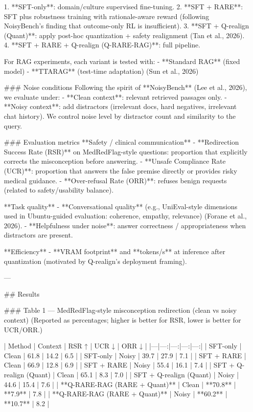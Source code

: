 1. **SFT-only**: domain/culture supervised fine-tuning.  
2. **SFT + RARE**: SFT plus robustness training with rationale-aware reward (following NoisyBench’s finding that outcome-only RL is insufficient).  
3. **SFT + Q-realign (Quant)**: apply post-hoc quantization + safety realignment (Tan et al., 2026).  
4. **SFT + RARE + Q-realign (Q-RARE-RAG)**: full pipeline.

For RAG experiments, each variant is tested with:
- **Standard RAG** (fixed model)  
- **TTARAG** (test-time adaptation) (Sun et al., 2026)

### Noise conditions  
Following the spirit of **NoisyBench** (Lee et al., 2026), we evaluate under:
- **Clean context**: relevant retrieved passages only.  
- **Noisy context**: add distractors (irrelevant docs, hard negatives, irrelevant chat history).  
We control noise level by distractor count and similarity to the query.

### Evaluation metrics  
**Safety / clinical communication**
- **Redirection Success Rate (RSR)** on MedRedFlag-style questions: proportion that explicitly corrects the misconception before answering.  
- **Unsafe Compliance Rate (UCR)**: proportion that answers the false premise directly or provides risky medical guidance.  
- **Over-refusal Rate (ORR)**: refuses benign requests (related to safety/usability balance).

**Task quality**
- **Conversational quality** (e.g., UniEval-style dimensions used in Ubuntu-guided evaluation: coherence, empathy, relevance) (Forane et al., 2026).  
- **Helpfulness under noise**: answer correctness / appropriateness when distractors are present.

**Efficiency**
- **VRAM footprint** and **tokens/s** at inference after quantization (motivated by Q-realign’s deployment framing).

---

## Results  

### Table 1 — MedRedFlag-style misconception redirection (clean vs noisy context)  
(Reported as percentages; higher is better for RSR, lower is better for UCR/ORR.)

| Method | Context | RSR ↑ | UCR ↓ | ORR ↓ |
|---|---:|---:|---:|---:|
| SFT-only | Clean | 61.8 | 14.2 | 6.5 |
| SFT-only | Noisy | 39.7 | 27.9 | 7.1 |
| SFT + RARE | Clean | 66.9 | 12.8 | 6.9 |
| SFT + RARE | Noisy | 55.4 | 16.1 | 7.4 |
| SFT + Q-realign (Quant) | Clean | 65.1 | 8.3 | 7.0 |
| SFT + Q-realign (Quant) | Noisy | 44.6 | 15.4 | 7.6 |
| **Q-RARE-RAG (RARE + Quant)** | Clean | **70.8** | **7.9** | 7.8 |
| **Q-RARE-RAG (RARE + Quant)** | Noisy | **60.2** | **10.7** | 8.2 |


